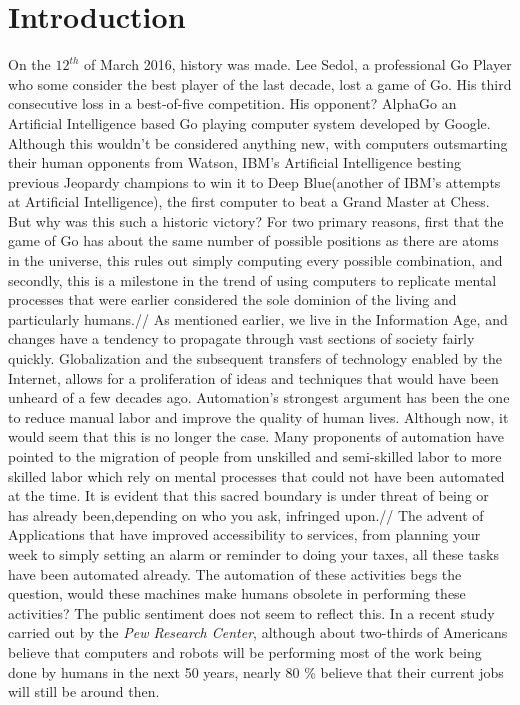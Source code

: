 \section{Introduction}
\label{sec:-intro}
	On the $12^{th}$ of March 2016, history was made. Lee Sedol, a professional Go Player who some consider the best player of the last decade, lost a game of Go. His third consecutive loss in a best-of-five competition. His opponent? AlphaGo an Artificial Intelligence based Go playing computer system developed by Google. %
	 Although this wouldn't be considered anything new, with computers outsmarting their human opponents from Watson, IBM's Artificial Intelligence besting previous Jeopardy champions to win it to Deep Blue(another of IBM's attempts at Artificial Intelligence), the first computer to beat a Grand Master at Chess. But why was this such a historic victory? For two primary reasons, first that the game of Go has about the same number of possible positions as there are atoms in the universe, this rules out simply computing every possible combination, and secondly, this is a milestone in the trend of using computers to replicate mental processes that were earlier considered the sole dominion of the living and particularly humans.//
	As mentioned earlier, we live in the Information Age, and changes have a tendency to propagate through vast sections of society fairly quickly. Globalization and the subsequent transfers of technology enabled by the Internet, allows for a proliferation of ideas and techniques that would have been unheard of a few decades ago. Automation's strongest argument has been the one to reduce manual labor and improve the quality of human lives. Although now, it would seem that this is no longer the case. Many proponents of automation have pointed to the migration of people from unskilled and semi-skilled labor to more skilled labor which rely on mental processes that could not have been automated at the time. It is evident that this sacred boundary is under threat of being or has already been,depending on who you ask, infringed upon.//
	The advent of Applications that have improved accessibility to services, from planning your week to simply setting an alarm or reminder to doing your taxes, all these tasks have been automated already. The automation of these activities begs the question, would these machines make humans obsolete in performing these activities? The public sentiment does not seem to reflect this. In a recent study carried out by the \textit{Pew Research Center}, although about two-thirds of Americans believe that computers and robots will be performing most of the work being done by humans in the next 50 years, nearly 80 \% believe that their current jobs will still be around then.\\
